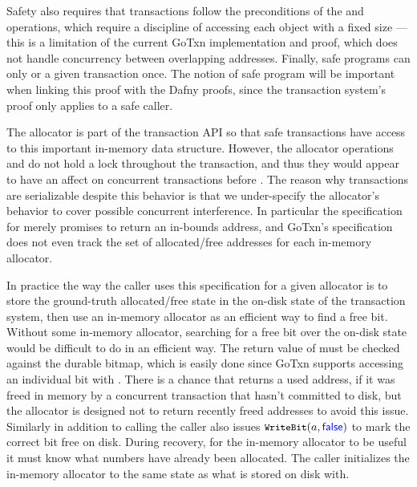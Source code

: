 Safety also requires that transactions follow the preconditions of the 
and  operations, which require a discipline of accessing each object
with a fixed size --- this is a limitation of the current GoTxn implementation
and proof, which does not handle concurrency between overlapping addresses.
Finally, safe programs can only  or  a
given transaction once. The notion of safe program will be important when
linking this proof with the Dafny proofs, since the transaction system's proof
only applies to a safe caller.

The allocator is part of the transaction API so that safe transactions have
access to this important in-memory data structure. However, the allocator
operations  and  do not hold a lock throughout the
transaction, and thus they would appear to have an affect on concurrent
transactions before . The reason why transactions are serializable
despite this behavior is that we under-specify the allocator's behavior to cover
possible concurrent interference. In particular the specification for 
merely promises to return an in-bounds address, and GoTxn's specification does
not even track the set of allocated/free addresses for each in-memory allocator.

In practice the way the caller uses this specification for a given allocator is
to store the ground-truth allocated/free state in the on-disk state of the
transaction system, then use an in-memory allocator as an efficient way to find
a free bit. Without some in-memory
allocator, searching for a free bit over the on-disk state would be difficult to do in an efficient
way. The return value of  must be checked against the durable bitmap,
which is easily done since GoTxn supports accessing an individual bit with
. There is a chance that  returns a used address, if it was
freed in memory by a concurrent transaction that hasn't committed to disk, but the allocator
is designed not to return recently freed addresses to avoid this issue.
Similarly in addition to calling  the caller also issues
$\cc{WriteBit}(a, \goosefalse)$ to mark the correct bit free on disk. During
recovery, for the in-memory allocator to be useful it must know what numbers
have already been allocated. The caller initializes the in-memory allocator to
the same state as what is stored on disk with.
